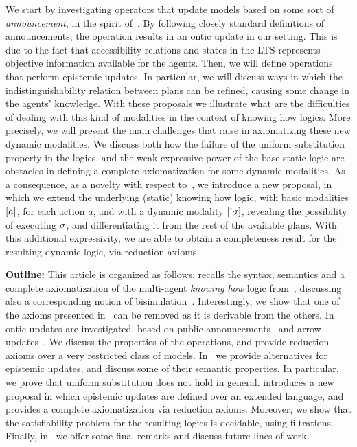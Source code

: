 We start by investigating operators that update models based on some sort of \emph{announcement}, in the spirit of~\cite{Plaza89:lopc}. By following closely standard definitions of announcements, the operation results in an ontic update in our setting. This is due to the fact that accessibility relations and states in the LTS represents objective information available for the agents. Then, we will define operations that perform epistemic updates. In particular, we will discuss ways in which the indistinguishability relation between plans can be refined, causing some change in the agents' knowledge. With these proposals we illustrate what are the difficulties of dealing with this kind of modalities in the context of knowing how logics. More precisely, we will present the main challenges that raise in axiomatizing these new dynamic modalities. We discuss both how the failure of the uniform substitution property in the logics, and the weak expressive power of the base static logic are obstacles in defining a complete axiomatization for some dynamic modalities. As a consequence, as a novelty with respect to~\cite{AFSV22}, we introduce a new proposal, in which we extend the underlying (static) knowing how logic, with basic modalities $[a]$, for each action $a$, and with a dynamic modality $[!\sigma]$, revealing the possibility of executing $\sigma$, and differentiating it from the rest of the available plans. With this additional expressivity, we are able to obtain a completeness result for the resulting dynamic logic, via reduction axioms.
\medskip

\noindent
\textbf{Outline:} This article is organized as follows.  recalls the syntax, semantics and a complete axiomatization of the multi-agent \emph{knowing how} logic from~\cite{AFSVQ21}, discussing also a corresponding notion of bisimulation~\cite{AFSVQ23report}. Interestingly, we show that one of the axioms presented in~\cite{AFSVQ21,AFSVQ23report} can be removed as it is derivable from the others. In~ ontic updates are investigated, based on public announcements~\cite{Plaza89:lopc} and arrow updates~\cite{KooiR11}. We discuss the properties of the operations, and provide reduction axioms over a very restricted class of models. In~ we provide alternatives for epistemic updates, and discuss some of their semantic properties. In particular, we prove that uniform substitution does not hold in general.  introduces a new proposal in which epistemic updates are defined over an extended language, and provides a complete axiomatization via reduction axioms. Moreover, we show that the satisfiability problem for the resulting logics is decidable, using filtrations.  Finally, in~ we offer some final remarks and discuss future lines of work.
